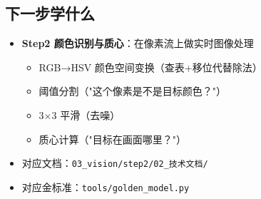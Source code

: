 \documentclass[11pt]{ctexart}
\begin{document}
\subsection{下一步学什么}

\begin{itemize}
  \item \textbf{Step2 颜色识别与质心}：在像素流上做实时图像处理
  \begin{itemize}
    \item RGB→HSV 颜色空间变换（查表+移位代替除法）
    \item 阈值分割（"这个像素是不是目标颜色？"）
    \item 3×3 平滑（去噪）
    \item 质心计算（"目标在画面哪里？"）
  \end{itemize}
  \item 对应文档：\texttt{03\_vision/step2/02\_技术文档/}
  \item 对应金标准：\texttt{tools/golden\_model.py}
\end{itemize}
\end{document}
